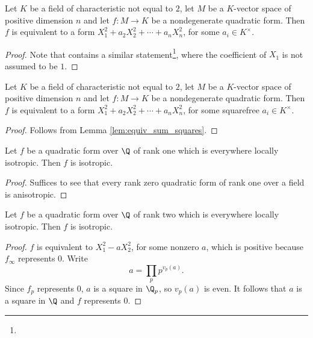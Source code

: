 \begin{lemma}\label{lem:equiv_sum_squares}
\leanok
Let $K$ be a field of characteristic not equal to $2$, let $M$ be a $K$-vector space of positive dimension $n$ and let $f : M \to K$ be a
nondegenerate quadratic form. Then $f$ is equivalent to a form $X_1^2 +  a_2X_2^2 + \cdots + a_nX_n^2$, for some $a_i \in K^\times$.
\end{lemma}
\begin{proof}
Note that \mathlib contains a similar statement\footnote{}, where the coefficient of $X_1$ is not assumed to be $1$.
\end{proof}

\begin{lemma}\label{lem:equiv_sum_squares_sqfree}
	\leanok
	Let $K$ be a field of characteristic not equal to $2$, let $M$ be a $K$-vector space of positive dimension $n$ and let $f : M \to K$ be a
	nondegenerate quadratic form. Then $f$ is equivalent to a form $X_1^2 +  a_2X_2^2 + \cdots + a_nX_n^2$, for some squarefree $a_i \in K^\times$.
\end{lemma}
\begin{proof}
Follows from Lemma \ref{lem:equiv_sum_squares}.
\end{proof}

\begin{lemma}\label{lem:isotr_of_rk_one}
	\leanok
	Let $f$ be a quadratic form over $\Q$ of rank one which is everywhere locally isotropic. Then $f$ is isotropic.
\end{lemma}
\begin{proof}
Suffices to see that every rank zero quadratic form of rank one over a field is anisotropic.
\end{proof}

\begin{lemma}\label{lem:isotr_of_rk_two}
	\leanok
	Let $f$ be a quadratic form over $\Q$ of rank two which is everywhere locally isotropic. Then $f$ is isotropic.
\end{lemma}
\begin{proof}
$f$ is equivalent to $X_1^2 - aX_2^2$, for some nonzero $a$, which is positive because $f_\infty$ represents $0$. Write
\[ a = \prod_p p^{v_p(a)}.\]
Since $f_p$ represents $0$, $a$ is a square in $\Q_p$, so $v_p(a)$ is even. It follows that $a$ is a square in $\Q$ and $f$ represents $0$.
\end{proof}

